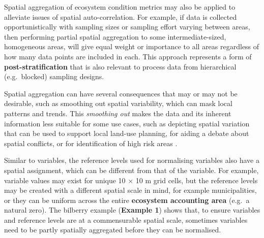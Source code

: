 \documentclass[
  authoryear,
  preprint,
  3p]{elsarticle}
\begin{document}
Spatial aggregation of ecosystem condition metrics may also be applied
to alleviate issues of spatial auto-correlation. For example, if data is
collected opportunistically with sampling sizes or sampling effort
varying between areas, then performing partial spatial aggregation to
some intermediate-sized, homogeneous areas, will give equal weight or
importance to all areas regardless of how many data points are included
in each. This approach represents a form of \textbf{post-stratification}
that is also relevant to process data from hierarchical (e.g.~blocked)
sampling designs.

Spatial aggregation can have several consequences that may or may not be
desirable, such as smoothing out spatial variability, which can mask
local patterns and trends. This \emph{smoothing out} makes the data and
its inherent information less suitable for some use cases, such as
depicting spatial variation that can be used to support local land-use
planning, for aiding a debate about spatial conflicts, or for
identification of high risk areas \citep{vanbeurden1999}.

Similar to variables, the reference levels used for normalising
variables also have a spatial assignment, which can be different from
that of the variable. For example, variable values may exist for unique
10 × 10 m grid cells, but the reference levels may be created with a
different spatial scale in mind, for example municipalities, or they can
be uniform across the entire \textbf{ecosystem accounting area} (e.g.~a
natural zero). The bilberry example (\textbf{Example 1}) shows that, to
ensure variables and reference levels are at a commensurable spatial
scale, sometimes variables need to be partly spatially aggregated before
they can be normalised.
\end{document}
